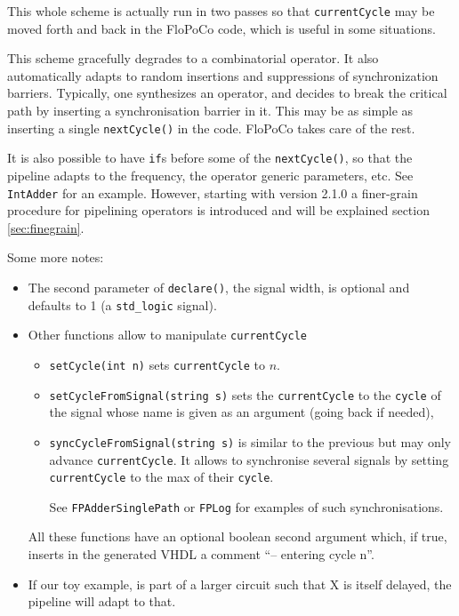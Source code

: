 \documentclass{article}
\begin{document}
This whole scheme is actually run in two passes so that
\verb!currentCycle! may be moved forth and back in the FloPoCo code, which is useful in some situations.

This scheme gracefully degrades to a
combinatorial operator. It also automatically adapts to random
insertions and suppressions of synchronization barriers. Typically,
one synthesizes an operator, and decides to break the critical path by
inserting a synchronisation barrier in it. This may be as simple as
inserting a single \verb!nextCycle()! in the code. FloPoCo takes care of the rest.

It is also possible to have \verb!if!s before some of the
\verb!nextCycle()!, so that the pipeline adapts to the frequency, the
operator generic parameters, etc. See \verb!IntAdder! for an example.
However, starting with version 2.1.0 a finer-grain procedure for pipelining 
operators is introduced and will be explained section \ref{sec:finegrain}.

Some more notes:
\begin{itemize}
\item The second parameter of \verb!declare()!, the signal width, is
  optional and defaults to 1 (a \verb!std_logic! signal).

\item Other functions allow to manipulate \verb!currentCycle!
  \begin{itemize}
  \item 
    \verb!setCycle(int n)! sets \verb!currentCycle! to  $n$.  
  \item \verb!setCycleFromSignal(string s)!  
    sets the \verb!currentCycle! to the \verb!cycle! of the signal
    whose name is given as an argument (going back if needed),
  \item 
    \verb!syncCycleFromSignal(string s)! is similar to the previous but may only advance
    \verb!currentCycle!. It allows to synchronise several
    signals by setting \verb!currentCycle! to the max of their
    \verb!cycle!.

See \verb!FPAdderSinglePath! or \verb!FPLog! for examples of
  such synchronisations. 
  \end{itemize}

All these functions have an optional boolean
  second argument which, if true, inserts in the generated VHDL a
  comment ``-- entering cycle n''.


\item If our toy example, is part of a larger circuit such that X is
  itself delayed, the pipeline will adapt to that.

\end{itemize}
\end{document}
